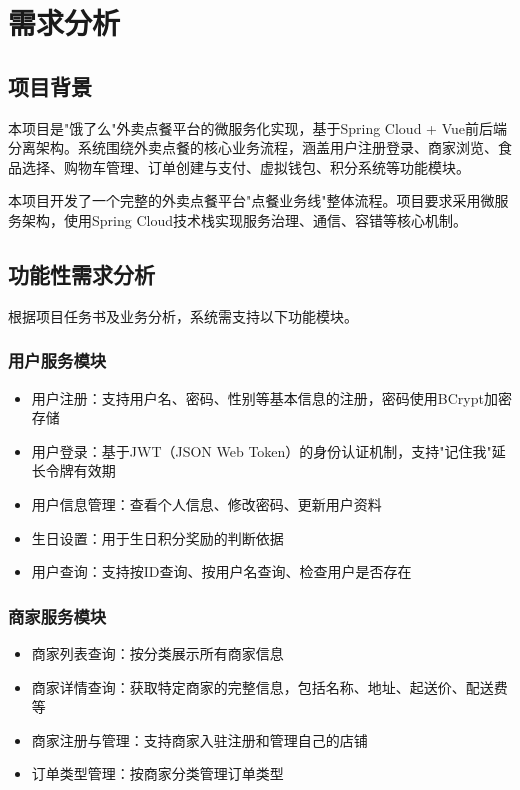 
\chapter{需求分析}

\section{项目背景}

本项目是"饿了么"外卖点餐平台的微服务化实现，基于Spring Cloud + Vue前后端分离架构。系统围绕外卖点餐的核心业务流程，涵盖用户注册登录、商家浏览、食品选择、购物车管理、订单创建与支付、虚拟钱包、积分系统等功能模块。

本项目开发了一个完整的外卖点餐平台"点餐业务线"整体流程。项目要求采用微服务架构，使用Spring Cloud技术栈实现服务治理、通信、容错等核心机制。

\section{功能性需求分析}

根据项目任务书及业务分析，系统需支持以下功能模块。

\subsection{用户服务模块}

\begin{itemize}
	\item 用户注册：支持用户名、密码、性别等基本信息的注册，密码使用BCrypt加密存储
	\item 用户登录：基于JWT（JSON Web Token）的身份认证机制，支持"记住我"延长令牌有效期
	\item 用户信息管理：查看个人信息、修改密码、更新用户资料
	\item 生日设置：用于生日积分奖励的判断依据
	\item 用户查询：支持按ID查询、按用户名查询、检查用户是否存在
\end{itemize}

\subsection{商家服务模块}

\begin{itemize}
	\item 商家列表查询：按分类展示所有商家信息
	\item 商家详情查询：获取特定商家的完整信息，包括名称、地址、起送价、配送费等
	\item 商家注册与管理：支持商家入驻注册和管理自己的店铺
	\item 订单类型管理：按商家分类管理订单类型
\end{itemize}


